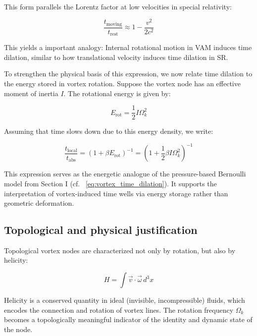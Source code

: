 This form parallels the Lorentz factor at low velocities in special relativity:

\begin{equation}
    \frac{t_\text{moving}}{t_\text{rest}} \approx 1 - \frac{v^2}{2c^2}\label{eq:parallels_lorentz_time_dilation}
\end{equation}

This yields a important analogy: Internal rotational motion in VAM induces time dilation, similar to how translational velocity induces time dilation in SR.

To strengthen the physical basis of this expression, we now relate time dilation to the energy stored in vortex rotation. Suppose the vortex node has an effective moment of inertia $I$. The rotational energy is given by:

\begin{equation}
    E_\text{rot} = \frac{1}{2} I \Omega_k^2\label{eq:rotational_energy_inertia}
\end{equation}

Assuming that time slows down due to this energy density, we write:

\begin{equation}
    \frac{t_\text{local}}{t_\text{abs}} = \left(1 + \beta E_\text{rot} \right)^{-1} = \left(1 + \frac{1}{2} \beta I \Omega_k^2 \right)^{-1}\label{eq:time_dilation_rotational_energy_inertia}
\end{equation}

This expression serves as the energetic analogue of the pressure-based Bernoulli model from Section I (cf. ~\eqref{eq:vortex_time_dilation}). It supports the interpretation of vortex-induced time wells via energy storage rather than geometric deformation.

\subsection{Topological and physical justification}

Topological vortex nodes are characterized not only by rotation, but also by helicity:

\begin{equation}
    H = \int \vec{v} \cdot \vec{\omega} \, d^3x \label{eq:helicity_rotation}
\end{equation}

Helicity is a conserved quantity in ideal (invisible, incompressible) fluids, which encodes the connection and rotation of vortex lines. The rotation frequency $\Omega_k$ becomes a topologically meaningful indicator of the identity and dynamic state of the node.

